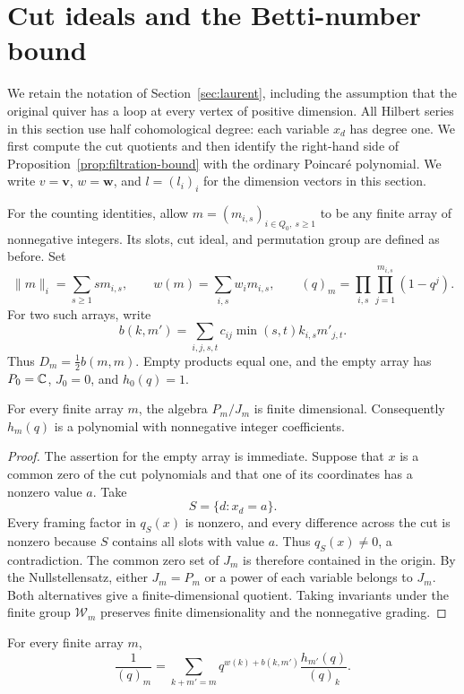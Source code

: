 \section{Cut ideals and the Betti-number bound}
\label{sec:counting}

We retain the notation of Section~\ref{sec:laurent}, including the assumption
that the original quiver has a loop at every vertex of positive dimension.
All Hilbert series in this section use half cohomological degree: each
variable $x_d$ has degree one.  We first compute the cut quotients and then
identify the right-hand side of Proposition~\ref{prop:filtration-bound} with
the ordinary Poincar\'e polynomial.
We write $v=\mathbf v$, $w=\mathbf w$, and $l=(l_i)_i$ for the dimension
vectors in this section.

For the counting identities, allow $m=(m_{i,s})_{i\in Q_0,\ s\geq1}$ to be any finite
array of nonnegative integers.  Its slots, cut ideal, and permutation group
are defined as before.  Set
\[
 \|m\|_i=\sum_{s\geq1}s m_{i,s},\qquad
 w(m)=\sum_{i,s}w_i m_{i,s},\qquad
 (q)_m=\prod_{i,s}\prod_{j=1}^{m_{i,s}}(1-q^j).
\]
For two such arrays, write
\[
 b(k,m')=\sum_{i,j,s,t}c_{ij}\min(s,t)k_{i,s}m'_{j,t}.
\]
Thus $D_m=\tfrac12 b(m,m)$.  Empty products equal one, and the empty array
has $P_0=\mathbb C$, $J_0=0$, and $h_0(q)=1$.

\begin{lemma}\label{lem:finite-cut-quotient}
For every finite array $m$, the algebra $P_m/J_m$ is finite dimensional.
Consequently $h_m(q)$ is a polynomial with nonnegative integer coefficients.
\end{lemma}

\begin{proof}
The assertion for the empty array is immediate.  Suppose that $x$ is a
common zero of the cut polynomials and that one of its coordinates has a
nonzero value $a$.  Take
\[
 S=\{d:x_d=a\}.
\]
Every framing factor in $q_S(x)$ is nonzero, and every difference across the
cut is nonzero because $S$ contains all slots with value $a$.  Thus
$q_S(x)\ne0$, a contradiction.  The common zero set of $J_m$ is therefore
contained in the origin.  By the Nullstellensatz, either $J_m=P_m$ or a
power of each variable belongs to $J_m$.  Both alternatives give a
finite-dimensional quotient.  Taking invariants under the finite group
$\mathcal W_m$ preserves finite dimensionality and the nonnegative grading.
\end{proof}

\begin{proposition}\label{prop:cut-recurrence}
For every finite array $m$,
\begin{equation}\label{eq:cut-recurrence}
 \frac{1}{(q)_m}
 =\sum_{k+m'=m}
   q^{w(k)+b(k,m')}\frac{h_{m'}(q)}{(q)_k}.
\end{equation}
\end{proposition}

